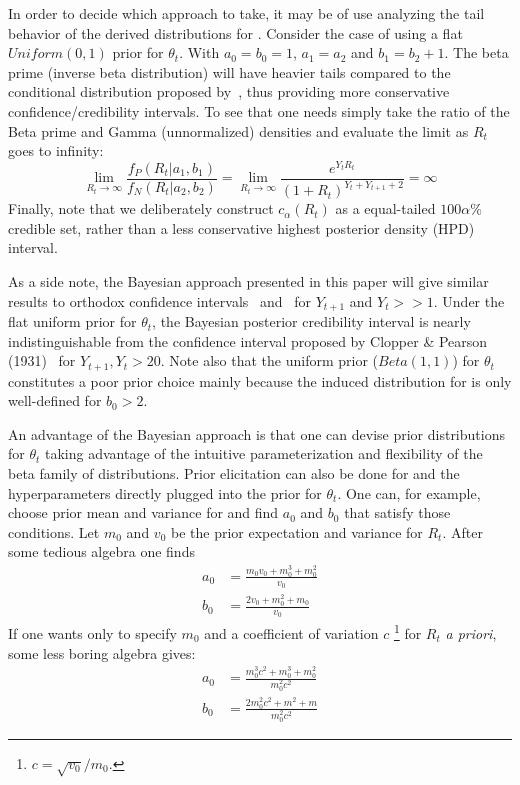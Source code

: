 In order to decide which approach to take, it may be of use analyzing the 
tail behavior of the derived distributions for \rr. 
Consider the case of using a flat $Uniform(0, 1)$ prior for $\theta_t$.
With $a_0 = b_0 = 1$, $a_1 = a_2$ and $b_1 = b_2 + 1$.
The beta prime (inverse beta distribution) will have heavier tails compared to 
the conditional distribution proposed by~\cite{nishiura}, thus providing more 
conservative confidence/credibility intervals.
To see that one needs simply take the ratio of the Beta prime and Gamma 
(unnormalized) densities and evaluate the limit as $R_t$ goes to infinity:
\begin{equation}
 \label{seq:densityratio}
 \lim_{R_t\to\infty}\frac{f_P(R_t| a_1, b_1)}{f_N(R_t| a_2, b_2)} =  
\lim_{R_t\to\infty}\frac{e^{Y_{t}R_t}}{(1 +R_t)^{Y_{t} + Y_{t +1}+2}} = \infty
\end{equation}
Finally, note that we deliberately construct $c_{\alpha}(R_{t})$ as a 
equal-tailed $100\alpha\%$ credible set, rather than a less conservative 
highest posterior density (HPD) interval.

As a side note, the Bayesian approach presented in this 
paper will give similar results to orthodox confidence intervals~\cite{wilson} 
and~\cite{clopper} for $Y_{t+1}$ and $Y_t >> 1$.
Under the flat  uniform prior for $\theta_t$, the Bayesian posterior 
credibility 
interval is nearly indistinguishable from the confidence interval proposed by 
Clopper \& Pearson (1931)~\cite{clopper} for $Y_{t+1}, Y_t > 20$.
Note also that the uniform prior ($Beta(1, 1)$) for $\theta_t$ constitutes a 
poor 
prior 
choice mainly because the induced distribution for \rr is only well-defined for 
$b_0 > 2$.

An advantage of the Bayesian approach is that one can devise prior 
distributions for $\theta_t$ taking advantage of the intuitive parameterization 
and flexibility of the beta family of distributions.
Prior elicitation can also be done for \rr and the hyperparameters directly 
plugged into the prior for $\theta_t$. 
One can, for example, choose prior mean and variance for \rr and find $a_0$ 
and $b_0$ that satisfy those conditions.
Let $m_0$ and $v_0$ be the prior expectation and variance for $R_t$. 
After some tedious algebra one finds
\begin{align}
\label{seq:elicitation}
a_0 &= \frac{m_0v_0 + m_0^3 + m_0^2}{v_0} \\
b_0 &= \frac{2v_0 + m_0^2 + m_0}{v_0}
\end{align}
If one wants only to specify $m_0$ and a coefficient of variation $c$ 
\footnote{$c = \sqrt{v_0}/ m_0$.} for $R_t$ \textit{a priori}, some less boring 
algebra gives:
\begin{align}
\label{seq:elicitationcv}
a_0 &= \frac{m_0^3c^2 + m_0^3 + m_0^2}{m_0^2c^2} \\
b_0 &= \frac{2m_0^2c^2 + m^2 + m}{m_0^2c^2}
\end{align}

